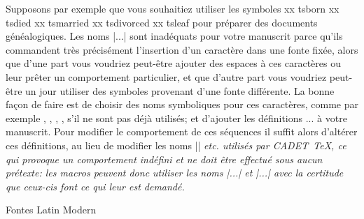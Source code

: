 Supposons par exemple que vous souhaitiez utiliser les symboles
\beginchartable
xx tsborn
xx tsdied
xx tsmarried
xx tsdivorced
xx tsleaf
\endchartable
pour préparer des documents généalogiques. Les noms |\ts...| sont
inadéquats pour votre manuscrit parce qu'ils commandent très
précisément l'insertion d'un caractère dans une fonte fixée, alors que
d'une part vous voudriez peut-être ajouter des espaces à ces
caractères ou leur prêter un comportement particulier, et que d'autre
part vous voudriez peut-être un jour utiliser des symboles provenant
d'une fonte différente. La bonne façon de faire est de choisir des
noms symboliques pour ces caractères, comme par exemple ,
, , ,  s'il ne sont pas
déjà utilisés; et d'ajouter les définitions
\begincode
\def\born{\tsborn}
\def\died{\tsdied}
...
\endcode
à votre manuscrit. Pour modifier le comportement de ces séquences il
suffit alors d'altérer ces définitions, au lieu de modifier les noms
|\tsborn| \em{etc.} utilisés par CADET~\TeX, ce qui provoque un
comportement indéfini et ne doit être effectué sous aucun prétexte:
les macros peuvent donc utiliser les noms |\ts...| et |\tl...| avec la
certitude que ceux-cis font ce qui leur est demandé.


\formalpar  Fontes Latin Modern

\begincode
{}
\endcode

\bye

